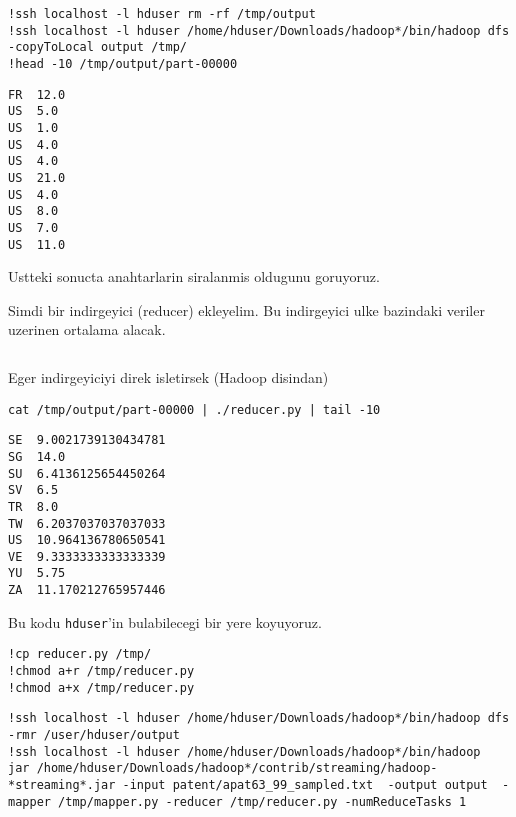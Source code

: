 \documentclass[12pt,fleqn]{article}\usepackage{../common}
\begin{document}
\begin{verbatim}
!ssh localhost -l hduser rm -rf /tmp/output
!ssh localhost -l hduser /home/hduser/Downloads/hadoop*/bin/hadoop dfs  -copyToLocal output /tmp/
!head -10 /tmp/output/part-00000
\end{verbatim}

\begin{verbatim}
FR	12.0
US	5.0
US	1.0
US	4.0
US	4.0
US	21.0
US	4.0
US	8.0
US	7.0
US	11.0
\end{verbatim}

Ustteki sonucta anahtarlarin siralanmis oldugunu goruyoruz.

Simdi bir indirgeyici (reducer) ekleyelim. Bu indirgeyici ulke bazindaki
veriler uzerinen ortalama alacak. 

\inputminted{python}{reducer.py}

Eger indirgeyiciyi direk isletirsek (Hadoop disindan)

\begin{verbatim}
cat /tmp/output/part-00000 | ./reducer.py | tail -10
\end{verbatim}

\begin{verbatim}
SE	9.0021739130434781
SG	14.0
SU	6.4136125654450264
SV	6.5
TR	8.0
TW	6.2037037037037033
US	10.964136780650541
VE	9.3333333333333339
YU	5.75
ZA	11.170212765957446
\end{verbatim}

Bu kodu \verb!hduser!'in bulabilecegi bir yere koyuyoruz. 

\begin{verbatim}
!cp reducer.py /tmp/
!chmod a+r /tmp/reducer.py
!chmod a+x /tmp/reducer.py
\end{verbatim}

\begin{verbatim}
!ssh localhost -l hduser /home/hduser/Downloads/hadoop*/bin/hadoop dfs -rmr /user/hduser/output
!ssh localhost -l hduser /home/hduser/Downloads/hadoop*/bin/hadoop  jar /home/hduser/Downloads/hadoop*/contrib/streaming/hadoop-*streaming*.jar -input patent/apat63_99_sampled.txt  -output output  -mapper /tmp/mapper.py -reducer /tmp/reducer.py -numReduceTasks 1 
\end{verbatim}
\end{document}
